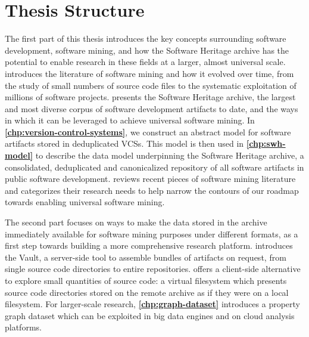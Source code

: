 \chapter*{Thesis Structure}

The first part of this thesis introduces the key concepts surrounding
software development, software mining, and how the Software Heritage archive
has the potential to enable research in these fields at a larger, almost
universal scale.
\textbf{} introduces the literature of software mining
and how it evolved over time, from the study of small numbers of source code
files to the systematic exploitation of millions of software projects.
\textbf{} presents the Software Heritage archive,
the largest and most diverse corpus of software development artifacts to date,
and the ways in which it can be leveraged to achieve universal software mining.
In \textbf{\cref{chp:version-control-systems}}, we construct an abstract model
for software artifacts stored in deduplicated \glspl{VCS}. This model is then
used in \textbf{\cref{chp:swh-model}} to describe the data model underpinning
the Software Heritage archive, a consolidated, deduplicated and canonicalized
repository of all software artifacts in public software development.
\textbf{} reviews recent pieces of software mining
literature and categorizes their research needs to help narrow the contours of
our roadmap towards enabling universal software mining.

The second part focuses on ways to make the data stored in the
archive immediately available for software mining purposes under different
formats, as a first step towards building a more comprehensive research
platform. \textbf{} introduces the Vault, a server-side tool to
assemble bundles of artifacts on request, from single source code directories
to entire repositories. \textbf{} offers a client-side
alternative to explore small quantities of source code: a virtual filesystem
which presents source code directories stored on the remote archive as if they
were on a local filesystem.  For larger-scale research,
\textbf{\cref{chp:graph-dataset}} introduces a property graph dataset which can
be exploited in big data engines and on cloud analysis platforms.

